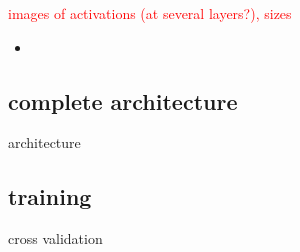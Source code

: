 \textcolor{red}{images of activations (at several layers?), sizes}

\begin{itemize}
	\item \url{}
\end{itemize}

\subsection{complete architecture}

architecture

\subsection{training}

cross validation
